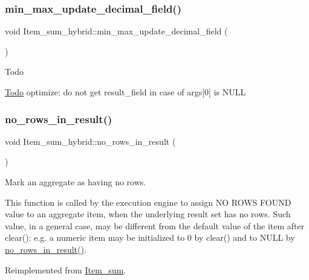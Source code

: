 \subsubsection{\texorpdfstring{min\+\_\+max\+\_\+update\+\_\+decimal\+\_\+field()}{min\_max\_update\_decimal\_field()}}
{\footnotesize\ttfamily void Item\+\_\+sum\+\_\+hybrid\+::min\+\_\+max\+\_\+update\+\_\+decimal\+\_\+field (\begin{DoxyParamCaption}{ }\end{DoxyParamCaption})}

\begin{DoxyRefDesc}{Todo}
\item[\mbox{\hyperlink{todo__todo000039}{Todo}}]optimize\+: do not get result\+\_\+field in case of args\mbox{[}0\mbox{]} is N\+U\+LL \end{DoxyRefDesc}
\mbox{\label{classItem__sum__hybrid_a7b06af139e0b7f7b0153252aa8f2e992}} 
\subsubsection{\texorpdfstring{no\+\_\+rows\+\_\+in\+\_\+result()}{no\_rows\_in\_result()}}
{\footnotesize\ttfamily void Item\+\_\+sum\+\_\+hybrid\+::no\+\_\+rows\+\_\+in\+\_\+result (\begin{DoxyParamCaption}{ }\end{DoxyParamCaption})\hspace{0.3cm}{\ttfamily [virtual]}}

Mark an aggregate as having no rows.

This function is called by the execution engine to assign \textquotesingle{}NO R\+O\+WS F\+O\+U\+ND\textquotesingle{} value to an aggregate item, when the underlying result set has no rows. Such value, in a general case, may be different from the default value of the item after \textquotesingle{}clear()\textquotesingle{}\+: e.\+g. a numeric item may be initialized to 0 by clear() and to N\+U\+LL by \mbox{\hyperlink{classItem__sum__hybrid_a7b06af139e0b7f7b0153252aa8f2e992}{no\+\_\+rows\+\_\+in\+\_\+result()}}. 

Reimplemented from \mbox{\hyperlink{classItem__sum_aba62f301a61ca3e686abf23e109bb0a8}{Item\+\_\+sum}}.

